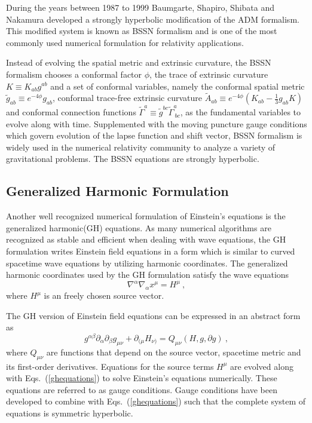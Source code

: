 During the years between 1987 to 1999 Baumgarte, Shapiro, Shibata and Nakamura\cite{Shibata:1995we, Baumgarte:1998te} developed a strongly hyperbolic modification of the ADM formalism. This modified system is known as BSSN formalism and is one of the most commonly used numerical formulation for relativity applications. 

Instead of evolving the spatial metric and extrinsic curvature, the BSSN formalism chooses a conformal factor $\phi$, the trace of extrinsic curvature $K \equiv K_{ab}g^{ab}$ and a set of conformal variables, namely the conformal spatial metric ${\tilde g}_{ab} \equiv e^{-4\phi}g_{ab}$, conformal trace-free extrinsic curvature ${\tilde A}_{ab} \equiv e^{-4\phi}(K_{ab} - \frac{1}{3}g_{ab}K)$ and conformal connection functions ${\tilde \Gamma}^{a} \equiv {\tilde g}^{bc}{\tilde \Gamma}^{a}_{~bc}$, as the fundamental variables to evolve along with time. Supplemented with the moving puncture gauge conditions which govern evolution of the lapse function and shift vector, BSSN formalism is widely used in the numerical relativity community to analyze a variety of gravitational problems. The BSSN equations are strongly hyperbolic. 

\subsection{Generalized Harmonic Formulation}
Another well recognized numerical formulation of Einstein's equations is the generalized harmonic(GH) equations\cite{Friedrich:1985, Garfinkle:2001ni, Pretorius:2006tp}. As many numerical algorithms are recognized as stable and efficient when dealing with wave equations, the GH formulation writes Einstein field equations in a form which is similar to curved spacetime wave equations by utilizing harmonic coordinates. The generalized harmonic coordinates used by the GH formulation satisfy the wave equations
\begin{equation}
	\nabla^{\alpha}\nabla_{\alpha}x^{\mu} = H^{\mu} \ ,
\end{equation}
where $H^{\mu}$ is an freely chosen source vector\cite{Friedrich:1985, Friedrich:1996, Garfinkle:2001ni}.

The GH version of Einstein field equations can be expressed in an abstract form as
\begin{equation}\label{ghequations}
	g^{\alpha\beta}\partial_{\alpha}\partial_{\beta}g_{\mu\nu} + \partial_{(\mu}H_{\nu)} = Q_{\mu\nu}(H, g, \partial g) \ , 
\end{equation}
where $Q_{\mu\nu}$ are functions that depend on the source vector, spacetime metric and its first-order derivatives. Equations for the source terms $H^{\mu}$ are evolved along with Eqs.~(\ref{ghequations}) to solve Einstein's equations numerically. These equations are referred to as gauge conditions. Gauge conditions\cite{Lindblom:2007xw, Lindblom:2009tu} have been developed to combine with Eqs.~(\ref{ghequations}) such that the complete system of equations is symmetric hyperbolic\cite{Lindblom:2005qh}. 

